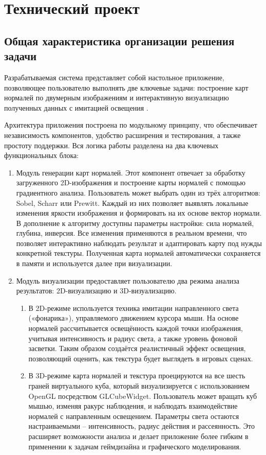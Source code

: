 \section{Технический проект}
\subsection{Общая характеристика организации решения задачи}

Разрабатываемая система представляет собой настольное приложение, позволяющее пользователю выполнять две ключевые задачи: построение карт нормалей по двумерным изображениям и интерактивную визуализацию полученных данных с имитацией освещения \cite{tidwell2020}.

Архитектура приложения построена по модульному принципу, что обеспечивает независимость компонентов, удобство расширения и тестирования, а также простоту поддержки. Вся логика работы разделена на два ключевых функциональных блока:

\begin{enumerate}
	\item Модуль генерации карт нормалей. Этот компонент отвечает за обработку загруженного 2D-изображения и построение карты нормалей с помощью градиентного анализа. Пользователь может выбрать один из трёх алгоритмов: Sobel, Scharr или Prewitt. Каждый из них позволяет выявлять локальные изменения яркости изображения и формировать на их основе вектор нормали. В дополнение к алгоритму доступны параметры настройки: сила нормалей, глубина, инверсия. Все изменения применяются в реальном времени, что позволяет интерактивно наблюдать результат и адаптировать карту под нужды конкретной текстуры. Полученная карта нормалей автоматически сохраняется в памяти и используется далее при визуализации.
	\item Модуль визуализации предоставляет пользователю два режима анализа результатов: 2D-визуализацию и 3D-визуализацию.
	\begin{enumerate}[label=\theenumi.\arabic*.]
		\item В 2D-режиме используется техника имитации направленного света («фонарика»), управляемого движением курсора мыши. На основе нормалей рассчитывается освещённость каждой точки изображения, учитывая интенсивность и радиус света, а также уровень фоновой засветки. Таким образом создаётся реалистичный эффект освещения, позволяющий оценить, как текстура будет выглядеть в игровых сценах.
		\item В 3D-режиме карта нормалей и текстура проецируются на все шесть граней виртуального куба, который визуализируется с использованием OpenGL посредством GLCubeWidget. Пользователь может вращать куб мышью, изменяя ракурс наблюдения, и наблюдать взаимодействие нормалей с направленным освещением. Параметры света остаются настраиваемыми -- интенсивность, радиус действия и рассеянность. Это расширяет возможности анализа и делает приложение более гибким в применении к задачам геймдизайна и графического моделирования.
	\end{enumerate}
\end{enumerate}

